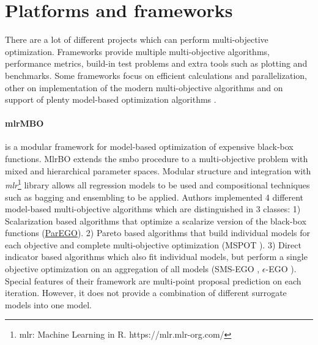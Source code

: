     \section{Platforms and frameworks}
        There are a lot of different projects which can perform multi-objective optimization. Frameworks provide multiple multi-objective algorithms, performance metrics, build-in test problems and extra tools such as plotting and benchmarks. Some frameworks focus on efficient calculations and parallelization\cite{francesco_biscani_2019}, other on implementation of the modern multi-objective algorithms \cite{benitezhidalgo2019jmetalpy, TianPlatEMO} and on support of plenty model-based optimization algorithms \cite{BischlmlrMBO}.

        \paragraph{mlrMBO}\cite{BischlmlrMBO} is a modular framework for model-based optimization of expensive black-box functions. MlrBO extends the \gls{smbo} procedure to a multi-objective problem with mixed and hierarchical parameter spaces. Modular structure and integration with \emph{mlr}\footnote{{mlr}: Machine Learning in R. https://mlr.mlr-org.com/} library allows all regression models to be used and compositional techniques such as bagging and ensembling to be applied. Authors implemented 4 different model-based multi-objective algorithms which are distinguished in 3 classes: 1) Scalarization based algorithms that optimize a scalarize version of the black-box functions (\hyperref[alg:ParEGO]{ParEGO}). 2) Pareto based algorithms that build individual models for each objective and complete multi-objective optimization (MSPOT \cite{ZaeffererBNWE13}). 3) Direct indicator based algorithms which also fit individual models, but perform a single objective optimization on an aggregation of all models (SMS-EGO \cite{inproceedings}, $\epsilon$-EGO \cite{WagEGOe}).
        Special features of their framework are multi-point proposal prediction on each iteration. However, it does not provide a combination of different surrogate models into one model.
       


